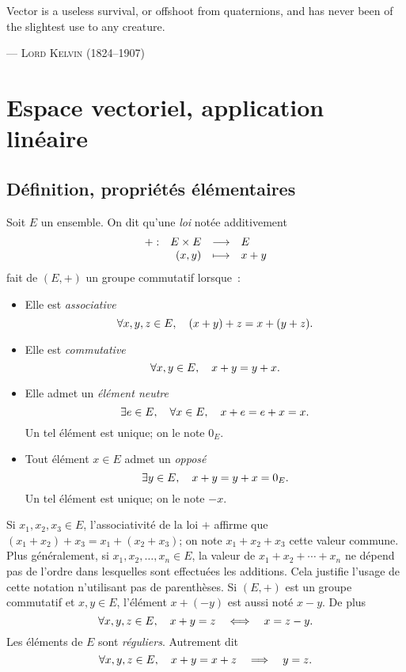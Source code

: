 \documentclass{magnolia}
\begin{document}
\setlength{}
\epigraph{\og Vector is a useless survival, or offshoot from quaternions, and has never been of the slightest use to any creature. \fg}{--- \textsc{Lord Kelvin (1824--1907)}}
\magtoc

\section{Espace vectoriel, application linéaire}
\subsection{Définition, propriétés élémentaires}

\begin{definition}
Soit $E$ un ensemble. On dit qu'une \emph{loi} notée additivement
\[\begin{array}[t]{lrcl} \displaystyle{+} : & \displaystyle{E\times E} & \longrightarrow & \displaystyle{E} \\ & \displaystyle{\left(x,y\right)} & \longmapsto & \displaystyle{x+y} \end{array}\]
fait de $(E,+)$ un groupe commutatif lorsque~:
\begin{itemize}
\item Elle est \emph{associative}
  \[\forall x,y,z\in E,\quad (x+y)+z=x+(y+z).\]
\item Elle est \emph{commutative}
  \[\forall x,y\in E,\quad x+y=y+x.\]
\item Elle admet un \emph{élément neutre}~
  \[\exists e\in E,\quad \forall x\in E ,\quad x+e=e+x=x.\]
  Un tel élément est unique; on le note $0_E$.
\item Tout élément $x\in E$ admet un \emph{opposé}~
\[\exists y\in E,\quad x+y=y+x=0_E.\]
Un tel élément est unique; on le note $-x$.
\end{itemize}
\end{definition}

\begin{remarques}
\remarque Si $x_1,x_2,x_3\in E$, l'associativité de la loi $+$ affirme que
  $(x_1+x_2)+x_3=x_1+(x_2+x_3)$; on note $x_1+x_2+x_3$ cette valeur commune. Plus
  généralement, si $x_1,x_2,\ldots,x_n\in E$, la valeur de $x_1+x_2+\cdots+x_n$ ne dépend
  pas de l'ordre dans lesquelles sont effectuées les additions. Cela justifie l'usage de
  cette notation n'utilisant pas de parenthèses.
\remarque Si $(E,+)$ est un groupe commutatif et $x,y\in E$, l'élément $x+(-y)$ est aussi
  noté $x-y$. De plus
  \[\forall x,y,z\in E,\quad x+y=z \quad\Longleftrightarrow\quad x = z-y.\]
\remarque Les éléments de $E$ sont \emph{réguliers}. Autrement dit
  \[\forall x,y,z\in E,\quad x+y=x+z \quad\Longrightarrow\quad  y=z.\]
\end{remarques}
\end{document}
